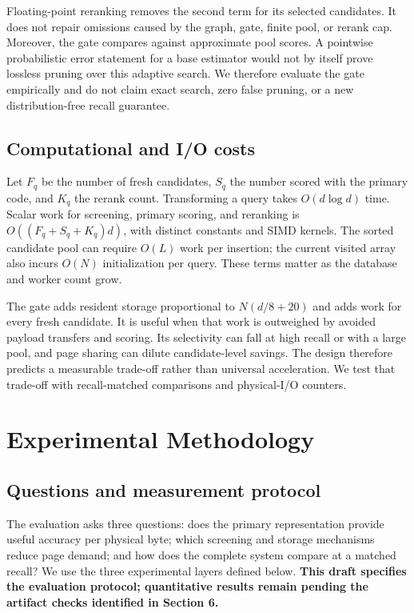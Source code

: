 Floating-point reranking removes the second term for its selected candidates. It does not repair omissions caused by the graph, gate, finite pool, or rerank cap. Moreover, the gate compares against approximate pool scores. A pointwise probabilistic error statement for a base estimator would not by itself prove lossless pruning over this adaptive search. We therefore evaluate the gate empirically and do not claim exact search, zero false pruning, or a new distribution-free recall guarantee.

\subsection{Computational and I/O costs}

Let $F_q$ be the number of fresh candidates, $S_q$ the number scored with the primary code, and $K_q$ the rerank count. Transforming a query takes $O(d\log d)$ time. Scalar work for screening, primary scoring, and reranking is $O((F_q+S_q+K_q)d)$, with distinct constants and SIMD kernels. The sorted candidate pool can require $O(L)$ work per insertion; the current visited array also incurs $O(N)$ initialization per query. These terms matter as the database and worker count grow.

The gate adds resident storage proportional to $N(d/8+20)$ and adds work for every fresh candidate. It is useful when that work is outweighed by avoided payload transfers and scoring. Its selectivity can fall at high recall or with a large pool, and page sharing can dilute candidate-level savings. The design therefore predicts a measurable trade-off rather than universal acceleration. We test that trade-off with recall-matched comparisons and physical-I/O counters.

\section{Experimental Methodology}

\subsection{Questions and measurement protocol}

The evaluation asks three questions: does the primary representation provide useful accuracy per physical byte; which screening and storage mechanisms reduce page demand; and how does the complete system compare at a matched recall? We use the three experimental layers defined below. \textbf{This draft specifies the evaluation protocol; quantitative results remain pending the artifact checks identified in Section 6.}

